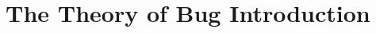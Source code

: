 \documentclass[a4paper, 12pt]{book}
\begin{document}
%
%
%
%
%



\cleardoublepage
\chapter{The Theory of Bug Introduction}
\label{chap:Theory}
\end{document}
